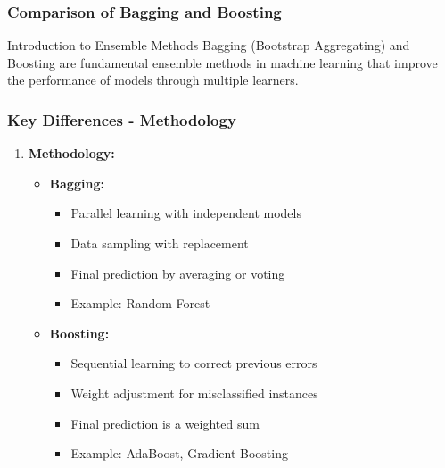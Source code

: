 \documentclass{beamer}
\begin{document}
\begin{frame}[fragile]
    \frametitle{Comparison of Bagging and Boosting}
    \begin{block}{Introduction to Ensemble Methods}
        Bagging (Bootstrap Aggregating) and Boosting are fundamental ensemble methods in machine learning that improve the performance of models through multiple learners.
    \end{block}
\end{frame}

\begin{frame}[fragile]
    \frametitle{Key Differences - Methodology}
    \begin{enumerate}
        \item \textbf{Methodology:}
        \begin{itemize}
            \item \textbf{Bagging:}
            \begin{itemize}
                \item Parallel learning with independent models
                \item Data sampling with replacement
                \item Final prediction by averaging or voting
                \item Example: Random Forest
            \end{itemize}
            \item \textbf{Boosting:}
            \begin{itemize}
                \item Sequential learning to correct previous errors
                \item Weight adjustment for misclassified instances
                \item Final prediction is a weighted sum
                \item Example: AdaBoost, Gradient Boosting
            \end{itemize}
        \end{itemize}
    \end{enumerate}
\end{frame}
\end{document}
